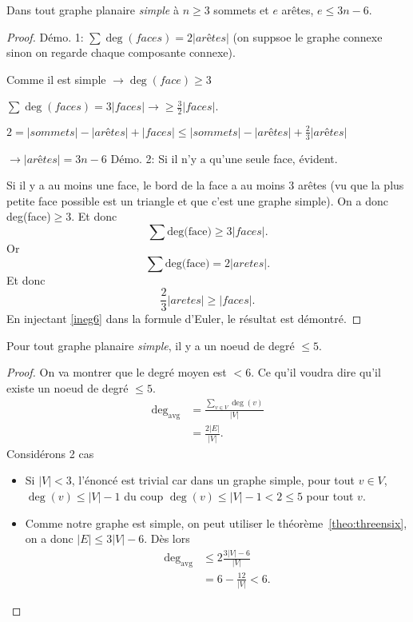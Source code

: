\begin{mytheo}
  \label{theo:threensix}
  Dans tout graphe planaire \emph{simple} à $n \geq 3$ sommets et $e$ arêtes,
  $e \leq 3n - 6$.
  \begin{proof}
  Démo. 1:
    $\sum \deg(faces) = 2 |arêtes|$ (on suppsoe le graphe connexe sinon on regarde chaque composante connexe).  
      
    Comme il est simple $\rightarrow \deg(face) \geq 3$
    
    $\sum \deg(faces) = 3 |faces| \rightarrow \geq \frac{3}{2}|faces|$.
    
    $2 = |sommets|-|arêtes| + |faces| \leq |sommets|-|arêtes| + \frac{2}{3}|arêtes|$
    
    $\rightarrow |arêtes| = 3n-6$
  \newline
  Démo. 2:
    Si il n'y a qu'une seule face, évident. 
    
    Si il y a au moins une face, le bord de la face a au moins 3 arêtes (vu que la plus petite face possible est un triangle et que c'est une graphe simple). On a donc deg(face)$\geq 3$. Et donc $$\sum \text{deg(face)} \geq 3 |faces| .$$
Or    $$\sum \text{deg(face)} = 2 |aretes|.$$
Et donc 
 \begin{equation} \label{ineg6}
 \frac{2}{3} |aretes| \geq |faces|.
\end{equation} 
    En injectant \ref{ineg6} dans la formule d'Euler, le résultat est démontré.   
  \end{proof}
\end{mytheo}

\begin{mytheo}
  Pour tout graphe planaire \emph{simple}, il y a un noeud de degré $\leq 5$.
  \begin{proof}
    On va montrer que le degré moyen est $< 6$.
    Ce qu'il voudra dire qu'il existe un noeud de degré $\leq 5$.
    \begin{align*}
      \deg_{\mathrm{avg}} & = \frac{\sum_{v\in V} \deg(v)}{|V|}\\
                          & = \frac{2|E|}{|V|}.
    \end{align*}
    Considérons 2 cas
    \begin{itemize}
      \item Si $|V| < 3$, l'énoncé est trivial car dans un graphe simple,
        pour tout $v \in V$, $\deg(v) \leq |V|-1$ du coup
        $\deg(v) \leq |V| - 1 < 2 \leq 5$ pour tout $v$.
      \item
        Comme notre graphe est simple,
        on peut utiliser le théorème~\ref{theo:threensix},
        on a donc $|E| \leq 3|V| - 6$.
        Dès lors
        \begin{align*}
          \deg_{\mathrm{avg}} & \leq 2\frac{3|V|-6}{|V|}\\
                              & = 6 - \frac{12}{|V|} < 6.
        \end{align*}
    \end{itemize}
  \end{proof}
\end{mytheo}

